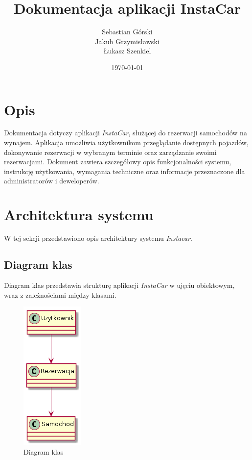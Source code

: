 \documentclass[12pt]{article}
\title{Dokumentacja aplikacji InstaCar}
\author{Sebastian Górski\\ Jakub Grzymisławski\\ Łukasz Szenkiel}
\date{\today}
\begin{document}
\maketitle

\newpage
\tableofcontents

\newpage
\section*{Opis}
	Dokumentacja dotyczy aplikacji \textit{InstaCar}, służącej do rezerwacji samochodów na wynajem. Aplikacja umożliwia użytkownikom przeglądanie dostępnych pojazdów, dokonywanie rezerwacji w wybranym terminie oraz zarządzanie swoimi rezerwacjami. Dokument zawiera szczegółowy opis funkcjonalności systemu, instrukcję użytkowania, wymagania techniczne oraz informacje przeznaczone dla administratorów i deweloperów.

\newpage
\section{Architektura systemu}
W tej sekcji przedstawiono opis architektury systemu \textit{Instacar}.
\subsection{Diagram klas}
Diagram klas przedstawia strukturę aplikacji \textit{InstaCar} w ujęciu obiektowym, wraz z zależnościami między klasami.

\begin{figure}[H]
	\centering
	\includegraphics[width=0.3\linewidth, height=0.5\textheight]{diagramKlas}
	\caption{Diagram klas}
	\label{fig:diagramklas.png}
\end{figure}
\end{document}

